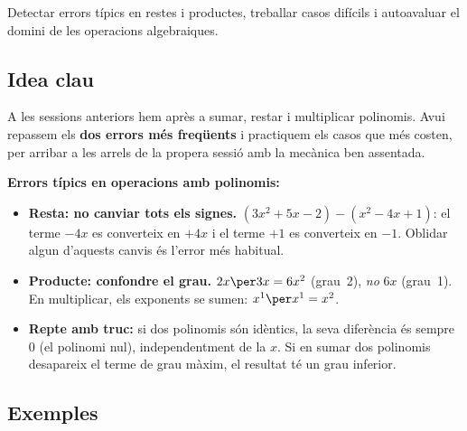 %
{Detectar errors típics en restes i productes, treballar casos difícils
i autoavaluar el domini de les operacions algebraiques.}

\subsection{Idea clau}

A les sessions anteriors hem après a sumar, restar i multiplicar polinomis.
Avui repassem els \textbf{dos errors més freqüents} i practiquem els casos
que més costen, per arribar a les arrels de la propera sessió amb la mecànica
ben assentada.

\begin{idea}
\textbf{Errors típics en operacions amb polinomis:}
\begin{itemize}[leftmargin=1.4em, itemsep=3pt]
  \item \textbf{Resta: no canviar tots els signes.}
        $(3x^2+5x-2)-(x^2-4x+1)$: el terme $-4x$ es converteix en $+4x$
        i el terme $+1$ es converteix en $-1$. Oblidar algun d'aquests
        canvis és l'error més habitual.
  \item \textbf{Producte: confondre el grau.}
        $2x\per 3x = 6x^2$ (grau~2), \emph{no} $6x$ (grau~1). En
        multiplicar, els exponents se sumen: $x^1\per x^1 = x^2$.
  \item \textbf{Repte amb truc:} si dos polinomis són idèntics, la seva
        diferència és sempre $0$ (el polinomi nul), independentment de la
        $x$. Si en sumar dos polinomis desapareix el terme de grau màxim,
        el resultat té un grau inferior.
\end{itemize}
\end{idea}

\subsection{Exemples}

